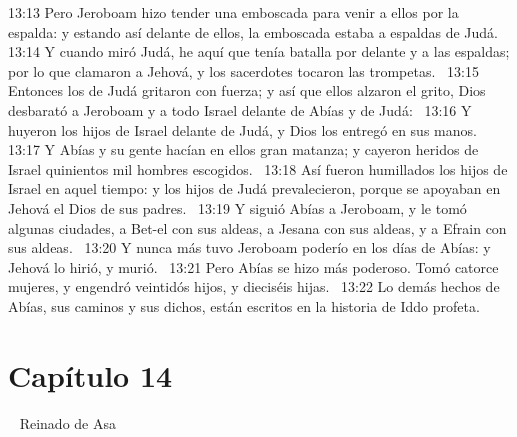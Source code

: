 													13:13 Pero Jeroboam hizo tender una emboscada para venir a ellos por la espalda: y estando así delante de ellos, la emboscada estaba a espaldas de Judá.  
													13:14 Y cuando miró Judá, he aquí que tenía batalla por delante y a las espaldas; por lo que clamaron a Jehová, y los sacerdotes tocaron las trompetas.  
													13:15 Entonces los de Judá gritaron con fuerza; y así que ellos alzaron el grito, Dios desbarató a Jeroboam y a todo Israel delante de Abías y de Judá:  
													13:16 Y huyeron los hijos de Israel delante de Judá, y Dios los entregó en sus manos.  
													13:17 Y Abías y su gente hacían en ellos gran matanza; y cayeron heridos de Israel quinientos mil hombres escogidos.  
													13:18 Así fueron humillados los hijos de Israel en aquel tiempo: y los hijos de Judá prevalecieron, porque se apoyaban en Jehová el Dios de sus padres.  
													13:19 Y siguió Abías a Jeroboam, y le tomó algunas ciudades, a Bet-el con sus aldeas, a Jesana con sus aldeas, y a Efrain con sus aldeas.  
													13:20 Y nunca más tuvo Jeroboam poderío en los días de Abías: y Jehová lo hirió, y murió.  
													13:21 Pero Abías se hizo más poderoso. Tomó catorce mujeres, y engendró veintidós hijos, y dieciséis hijas.  
													13:22 Lo demás hechos de Abías, sus caminos y sus dichos, están escritos en la historia de Iddo profeta.  
													\section*{Capítulo 14} 
														Reinado de Asa  
														
